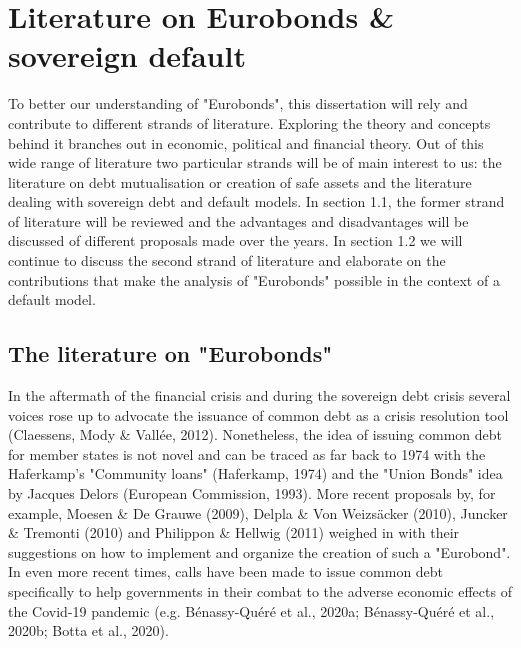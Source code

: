 
\pagestyle{headings}

\chapter{Literature on Eurobonds \& sovereign default}
To better our understanding of "Eurobonds", this dissertation will rely and contribute to different strands of literature. Exploring the theory and concepts behind it branches out in economic, political and financial theory. Out of this wide range of literature two particular strands will be of main interest to us: the literature on debt mutualisation or creation of safe assets and the literature dealing with sovereign debt and default models. In section 1.1, the former strand of literature will be reviewed and the advantages and disadvantages will be discussed of different proposals made over the years. In section 1.2 we will continue to discuss the second strand of literature and elaborate on the contributions that make the analysis of "Eurobonds" possible in the context of a default model.\\


\section{The literature on "Eurobonds"}
In the aftermath of the financial crisis and during the sovereign debt crisis several voices rose up to advocate the issuance of common debt as a crisis resolution tool (Claessens, Mody \& Vallée, 2012). Nonetheless, the idea of issuing common debt for member states is not novel and can be traced as far back to 1974 with the Haferkamp's "Community loans" (Haferkamp, 1974) and the "Union Bonds" idea by Jacques Delors (European Commission, 1993). More recent proposals by, for example, Moesen \& De Grauwe (2009), Delpla \& Von Weizsäcker (2010), Juncker \& Tremonti (2010) and Philippon \& Hellwig (2011) weighed in with their suggestions on how to implement and organize the creation of such a "Eurobond". In even more recent times, calls have been made to issue common debt specifically to help governments in their combat to the adverse economic effects of the Covid-19 pandemic (e.g. Bénassy-Quéré et al., 2020a; Bénassy-Quéré et al., 2020b; Botta et al., 2020).\\ 

